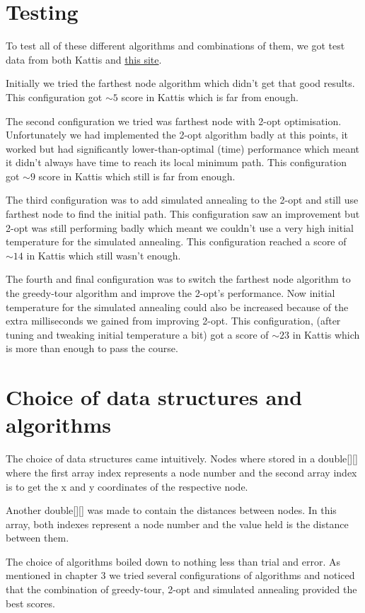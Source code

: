 \documentclass{article}[11pt, a4paper]
\begin{document}
\section{Testing}
To test all of these different algorithms and combinations of them, we got test data from both Kattis and \href{https://www.math.uwaterloo.ca/tsp/world/countries.html}{this site}.

Initially we tried the farthest node algorithm which didn't get that good results. This configuration got $\sim 5$ score in Kattis which is far from enough.

The second configuration we tried was farthest node with 2-opt optimisation. Unfortunately we had implemented the 2-opt algorithm badly at this points, it worked but had significantly lower-than-optimal (time) performance which meant it didn't always have time to reach its local minimum path. This configuration got $\sim 9$ score in Kattis which still is far from enough.

The third configuration was to add simulated annealing to the 2-opt and still use farthest node to find the initial path. This configuration saw an improvement but 2-opt was still performing badly which meant we couldn't use a very high initial temperature for the simulated annealing. This configuration reached a score of $\sim 14$ in Kattis which still wasn't enough.

The fourth and final configuration was to switch the farthest node algorithm to the greedy-tour algorithm and improve the 2-opt's performance. Now initial temperature for the simulated annealing could also be increased because of the extra milliseconds we gained from improving 2-opt. This configuration, (after tuning and tweaking initial temperature a bit) got a score of $\sim 23$ in Kattis which is more than enough to pass the course.

\section{Choice of data structures and algorithms}
The choice of data structures came intuitively. Nodes where stored in a double[][] where the first array index represents a node number and the second array index is to get the x and y coordinates of the respective node.

Another double[][] was made to contain the distances between nodes. In this array, both indexes represent a node number and the value held is the distance between them.

The choice of algorithms boiled down to nothing less than trial and error. As mentioned in chapter 3 we tried several configurations of algorithms and noticed that the combination of greedy-tour, 2-opt and simulated annealing provided the best scores. 
\end{document}
